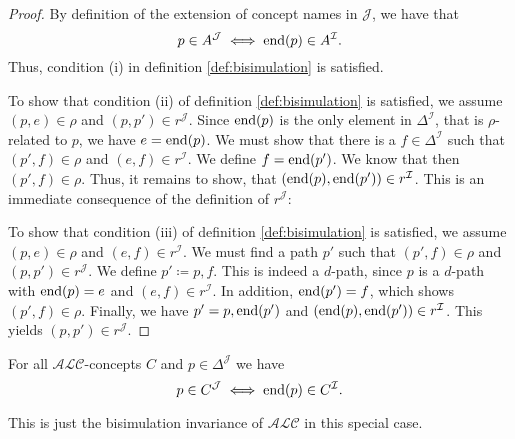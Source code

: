 \begin{proof}
	By definition of the extension of concept names in $\mathcal{J}$, we have that
	\[
		p \in A^{\mathcal{J}} \iff \operatorname{\text{end}}(p) \in A^{\mathcal{I}}
	.\]
	Thus, condition (i) in definition \ref{def:bisimulation} is satisfied.

	To show that condition (ii) of definition \ref{def:bisimulation} is satisfied, 
	we assume $(p,e) \in \rho$ and $(p,p') \in r^\mathcal{J}$.
	Since $\operatorname{\text{end}}(p)$ is the only element in $\Delta^{\mathcal{I}}$, that is $\rho$-related to $p$,
	we have $e = \operatorname{\text{end}}(p)$.
	We must show that there is a $f \in \Delta^{\mathcal{I}}$ such that $(p',f) \in \rho$ and $(e,f) \in r^{\mathcal{I}}$.
	We define $f = \operatorname{\text{end}}(p')$.
	We know that then $(p',f) \in \rho$.
	Thus, it remains to show, that $(\operatorname{\text{end}}(p),\operatorname{\text{end}}(p')) \in r^{\mathcal{I}}$.
	This is an immediate consequence of the definition of $r^{\mathcal{J}}$:

	To show that condition (iii) of definition \ref{def:bisimulation} is satisfied,
	we assume $(p,e) \in \rho$ and $(e,f) \in r^{\mathcal{I}}$.
	We must find a path $p'$ such that $(p',f) \in \rho$ and $(p,p') \in r^{\mathcal{J}}$.
	We define $p' \coloneqq p,f$.
	This is indeed a $d$-path, since $p$ is a $d$-path with $\operatorname{\text{end}}(p) = e$ 
	and $(e,f) \in r^{\mathcal{I}}$.
	In addition, $\operatorname{\text{end}}(p') = f$, which shows $(p',f) \in \rho$.
	Finally, we have $p' = p,\operatorname{\text{end}}(p')$ and $(\operatorname{\text{end}}(p), \operatorname{\text{end}}(p')) \in r^\mathcal{I}$.
	This yields $(p,p') \in r^\mathcal{J}$.
\end{proof}

\begin{prop}\label{prop:tree model invariance}
	For all $\mathcal{ALC}$-concepts $C$ and $p \in \Delta^{\mathcal{J}}$ we have
	\[
		p \in C^{\mathcal{J}} \iff \operatorname{\text{end}}(p) \in C^{\mathcal{I}}
	.\]
\end{prop}
This is just the bisimulation invariance of $\mathcal{ALC}$ in this special case.


